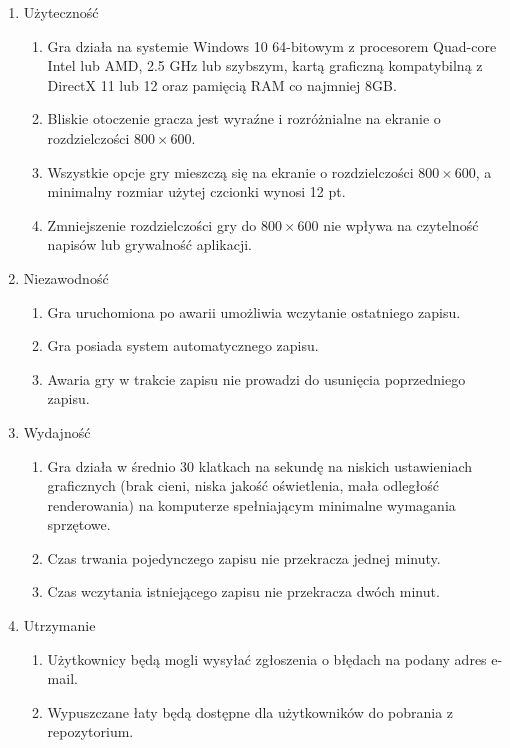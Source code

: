 \begin{enumerate}
    \item Użyteczność
        \begin{enumerate}
            \item Gra działa na systemie Windows 10 64-bitowym z procesorem Quad-core Intel lub AMD, 2.5 GHz lub szybszym, kartą graficzną kompatybilną z DirectX 11 lub 12 oraz  pamięcią RAM co najmniej 8GB.
            \item Bliskie otoczenie gracza jest wyraźne i rozróżnialne na ekranie o rozdzielczości $800\times 600$.
            \item Wszystkie opcje gry mieszczą się na ekranie o rozdzielczości $800\times 600$, a minimalny rozmiar użytej czcionki wynosi 12 pt.
            \item Zmniejszenie rozdzielczości gry do $800\times 600$ nie wpływa na czytelność napisów lub grywalność aplikacji.
        \end{enumerate}
    
    \item Niezawodność
        \begin{enumerate}
            \item Gra uruchomiona po awarii umożliwia wczytanie ostatniego zapisu.
            \item Gra posiada system automatycznego zapisu.
            \item Awaria gry w trakcie zapisu nie prowadzi do usunięcia poprzedniego zapisu.
        \end{enumerate}
        
    \item Wydajność
        \begin{enumerate}
            \item Gra działa w średnio 30 klatkach na sekundę na niskich ustawieniach graficznych (brak cieni, niska jakość oświetlenia, mała odległość renderowania) na komputerze spełniającym minimalne wymagania sprzętowe.
            \item Czas trwania pojedynczego zapisu nie przekracza jednej minuty.
            \item Czas wczytania istniejącego zapisu nie przekracza dwóch minut.
        \end{enumerate}
        
    \item Utrzymanie
        \begin{enumerate}
            \item Użytkownicy będą mogli wysyłać zgłoszenia o błędach na podany adres e-mail.
            \item Wypuszczane łaty będą dostępne dla użytkowników do pobrania z repozytorium.
        \end{enumerate}
\end{enumerate}